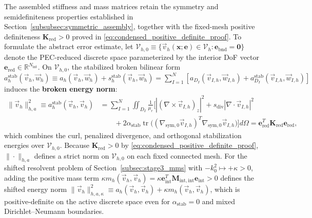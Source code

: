 \documentclass[VANCOUVER]{USG}
\begin{document}
The assembled stiffness and mass matrices retain the symmetry and semidefiniteness properties established in Section~\ref{subsubsec:symmetric_assembly}, together with the fixed-mesh positive definiteness $\mathbf{K}_{\mathrm{red}} > 0$ proved in \eqref{eq:condensed_positive_definite_proof}. To formulate the abstract error estimate, let $\mathcal{V}_{h,0} \equiv \{ \vec{v}_h(\mathbf{x}; \mathbf{e}) \in \mathcal{V}_h : \mathbf{e}_{\mathrm{bnd}} = \mathbf{0} \}$ denote the PEC-reduced discrete space parameterized by the interior DoF vector $\mathbf{e}_{\mathrm{red}} \in \mathbb{R}^{N_{\mathrm{int}}}$. On $\mathcal{V}_{h,0}$, the stabilized broken bilinear form $a_h^{\mathrm{stab}}(\vec{v}_h, \vec{w}_h) \equiv a_h(\vec{v}_h, \vec{w}_h) + s_h^{\mathrm{stab}}(\vec{v}_h, \vec{w}_h) = \sum_{I=1}^N [a_{D_I}(\vec{v}_{I,h}, \vec{w}_{I,h}) + a_{D_I}^{\mathrm{stab}}(\vec{v}_{I,h}, \vec{w}_{I,h})]$ induces the \textbf{broken energy norm}:
\begin{equation}
    \begin{aligned}
        \|\vec{v}_h\|_{h, a}^2 \equiv a_h^{\mathrm{stab}}(\vec{v}_h, \vec{v}_h) & = \sum_{I=1}^N \iint_{D_I} \frac{1}{\mu_r} \Big[ |(\nabla \times \vec{v}_{I,h})_z|^2 + s_{\mathrm{div}} |\nabla \cdot \vec{v}_{I,h}|^2 \\
                                                                                & \qquad + 2\alpha_{\mathrm{stab}} \operatorname{tr}\!\big((\nabla_{\mathrm{sym},0}\vec{v}_{I,h})^T \nabla_{\mathrm{sym},0}\vec{v}_{I,h}\big) \Big] d\Omega = \mathbf{e}_{\mathrm{red}}^T \mathbf{K}_{\mathrm{red}} \mathbf{e}_{\mathrm{red}},
    \end{aligned}
    \label{eq:broken_energy_norm_def}
\end{equation}
which combines the curl, penalized divergence, and orthogonal stabilization energies over $\mathcal{V}_{h,0}$. Because $\mathbf{K}_{\mathrm{red}} > 0$ by \eqref{eq:condensed_positive_definite_proof}, $\|\cdot\|_{h,a}$ defines a strict norm on $\mathcal{V}_{h,0}$ on each fixed connected mesh. For the shifted resolvent problem of Section~\ref{subsec:stage3_mms} with $-k_0^2 \mapsto +\kappa > 0$, adding the positive mass term $\kappa m_h(\vec{v}_h, \vec{v}_h) = \kappa \mathbf{e}_{\mathrm{int}}^T \mathbf{M}_{\mathrm{int},\mathrm{int}} \mathbf{e}_{\mathrm{int}} > 0$ defines the shifted energy norm $\|\vec{v}_h\|_{h,a,\kappa}^2 \equiv a_h(\vec{v}_h, \vec{v}_h) + \kappa m_h(\vec{v}_h, \vec{v}_h)$, which is positive-definite on the active discrete space even for $\alpha_{\mathrm{stab}} = 0$ and mixed Dirichlet--Neumann boundaries.
\end{document}
